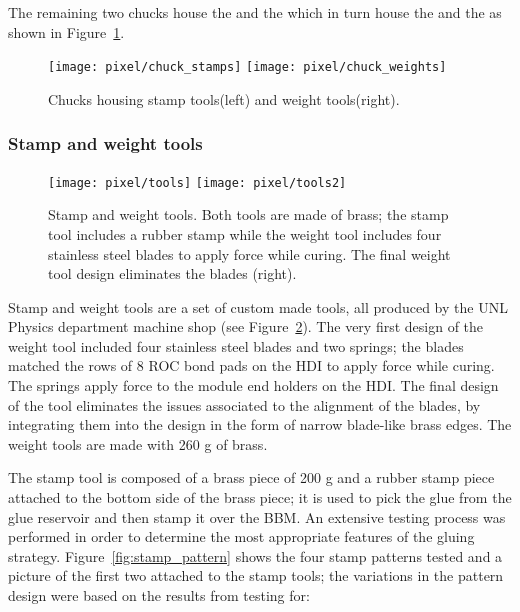 The remaining two chucks house the  and the  which in turn house the  and the  as shown in Figure~\ref{fig:st_wt_plates}. 

\begin{figure}[!h]
  \centering
  \texttt{[image: pixel/chuck\_stamps]}
  \texttt{[image: pixel/chuck\_weights]}
  \caption[Stamp and Weight tools in chucks]{Chucks housing stamp tools(left) and weight tools(right).}\label{fig:st_wt_plates}
\end{figure}

\subsubsection*{Stamp and weight tools}

\begin{figure}[!h]
  \centering
  \texttt{[image: pixel/tools]}
  \texttt{[image: pixel/tools2]}
  \caption[Stamp and Weight tools]{Stamp and weight tools. Both tools are made of brass; the stamp tool includes a rubber stamp while the weight tool includes four stainless steel blades to apply force while curing. The final weight tool design eliminates the blades (right).}\label{fig:st_wt}
\end{figure}

Stamp and weight tools are a set of custom made tools, all produced by the UNL Physics department machine shop (see Figure~\ref{fig:st_wt}). The very first design of the weight tool included four stainless steel blades and two springs; the blades matched the rows of 8 ROC bond pads on the HDI to apply force while curing. The springs apply force to the module end holders on the HDI. The final design of the tool eliminates the issues associated to the alignment of the blades, by integrating them into the design in the form of narrow blade-like brass edges. The weight tools are made with 260 g of brass.      

The stamp tool is composed of a brass piece of 200 g and a rubber stamp piece attached to the bottom side of the brass piece; it is used to pick the glue from the glue reservoir and then stamp it over the BBM. An extensive testing process was performed in order to determine the most appropriate features of the gluing strategy. Figure~\ref{fig:stamp_pattern} shows the four stamp patterns tested and a picture of the first two attached to the stamp tools; the variations in the pattern design were based on the results from testing for:

